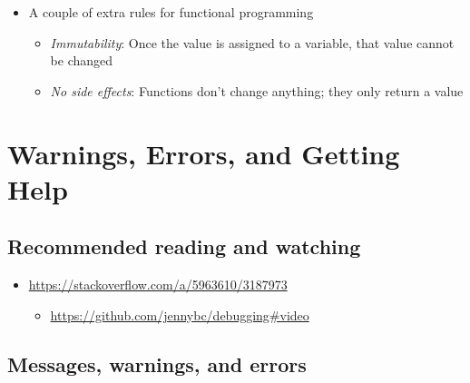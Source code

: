 \documentclass[
]{article}
\providecommand{\tightlist}{%
  \setlength{\itemsep}{0pt}\setlength{\parskip}{0pt}}
\begin{document}
\begin{itemize}
\begin{itemize}
    \begin{itemize}
    \tightlist
    \item
      Example: Raw data are read in, cleaned, and then a regression model is fit. The model coefficients are tested for statistical significance, and a table and plot are written out to disk.\\
    \item
      \textbf{Data analysis as building a series of pipes}
    \item
      Examples (mostly): R, Lisp, Haskell
    \end{itemize}
  \item
    A couple of extra rules for functional programming

    \begin{itemize}
    \tightlist
    \item
      \emph{Immutability}: Once the value is assigned to a variable, that value cannot be changed
    \item
      \emph{No side effects}: Functions don't change anything; they only return a value
    \end{itemize}
  \end{itemize}
\end{itemize}

\hypertarget{warnings-errors-and-getting-help}{%
\section{Warnings, Errors, and Getting Help}\label{warnings-errors-and-getting-help}}

\hypertarget{recommended-reading-and-watching}{%
\subsection{Recommended reading and watching}\label{recommended-reading-and-watching}}

\begin{itemize}
\tightlist
\item
  \url{https://stackoverflow.com/a/5963610/3187973}

  \begin{itemize}
  \tightlist
  \item
    \url{https://github.com/jennybc/debugging\#video}
  \end{itemize}
\end{itemize}

\hypertarget{messages-warnings-and-errors}{%
\subsection{Messages, warnings, and errors}\label{messages-warnings-and-errors}}
\end{document}
